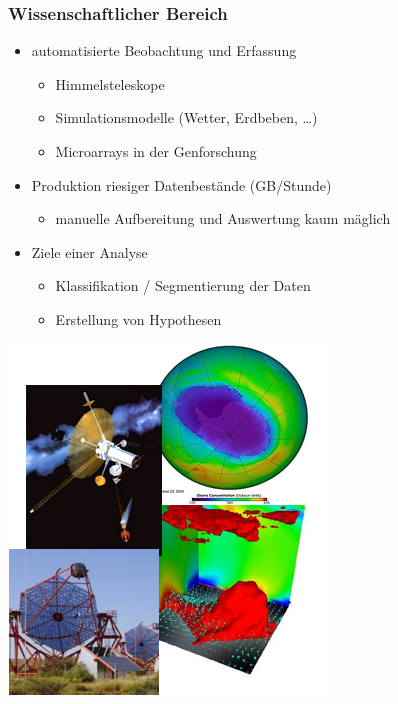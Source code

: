 \begin{frame}
\frametitle{Wissenschaftlicher Bereich}

\begin{minipage}[c]{7cm}
\begin{itemize}
\item automatisierte Beobachtung und Erfassung
\begin{itemize}
\item Himmelsteleskope
\item Simulationsmodelle (Wetter, Erdbeben, \dots)
\item Microarrays in der Genforschung
\end{itemize}
\item Produktion riesiger Datenbestände (GB/Stunde)
\begin{itemize}
\item manuelle Aufbereitung und Auswertung kaum mäglich
\end{itemize}
\item Ziele einer Analyse
\begin{itemize}
\item Klassifikation / Segmentierung der Daten
\item Erstellung von Hypothesen
\end{itemize}
\end{itemize}
\end{minipage}\quad
\begin{minipage}[c]{3cm}
\includegraphics[scale=.3]{fig1/wiss-anwendung.png}
\end{minipage}

\end{frame}

